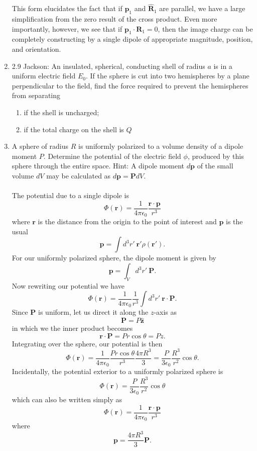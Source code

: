 \documentclass[11pt,letterpaper]{article}
\newcommand{\vect}[1]{\mathbf{#1}}
\newcommand{\vecth}[1]{\hat{\mathbf{#1}}}
\begin{document}
\begin{enumerate}
This form elucidates the fact that if $\vect p_1$ and $\vecth R_1$ are parallel, we have a large simplification from the zero result of the cross product. Even more importantly, however, we see that if $\vect p_1\cdot\vect R_1 =0 $, then the image charge can be completely constructing by a single dipole of appropriate magnitude, position, and orientation. 
  \item 2.9 Jackson: An insulated, spherical, conducting shell of radius $a$ is in a uniform electric field $E_0$. If the sphere is cut into two hemispheres by a plane perpendicular to the field, find the force required to prevent the hemispheres from separating
  \begin{enumerate}
  \item if the shell is uncharged;
  \item if the total charge on the shell is $Q$
  \end{enumerate}
  \item A sphere of radius $R$ is uniformly polarized to a volume density of a dipole moment $P$. Determine the potential of the electric field $\phi$, produced by this sphere through the entire space. Hint: A dipole moment $d\vect p$ of the small volume $dV$ may be calculated as $d\vect p=\vect PdV$. 
  \\ \\The potential due to a single dipole is 
  $$\Phi(\vect r) = \frac{1}{4\pi\epsilon_0}\frac{\vect r\cdot\vect p}{r^3}$$
  where $\vect r$ is the distance from the origin to the point of interest and $\vect p$ is the usual
  $$\vect p = \int{d^3r'\ \vect r'\rho(\vect r')}.$$
  For our uniformly polarized sphere, the dipole moment is given by
  $$\vect p = \int_{V}{d^3r'\ \vect P}.$$
  Now rewriting our potential we have
  $$\Phi(\vect r) = \frac{1}{4\pi\epsilon_0}\frac{1}{r^3}\int{d^3r'\ \vect r\cdot\vect P}.$$
  Since $\vect P$ is uniform, let us direct it along the $z$-axis as
  $$\vect P = P\vecth z$$
  in which we the inner product becomes
  $$\vect r\cdot\vect P = Pr\cos\theta = Pz.$$
  Integrating over the sphere, our potential is then
  $$\Phi(\vect r) = \frac{1}{4\pi\epsilon_0}\frac{Pr\cos\theta}{r^3}\frac{4\pi R^3}{3} = \frac{P}{3\epsilon_0}\frac{R^3}{r^2}\cos\theta.$$
  Incidentally, the potential exterior to a uniformly polarized sphere is 
  $$\Phi(\vect r) = \frac{P}{3\epsilon_0}\frac{R^3}{r^2}\cos\theta$$
  which can also be written simply as
  $$\Phi(\vect r) = \frac{1}{4\pi\epsilon_0}\frac{\vect r\cdot\vect p}{r^3}$$
  where 
  $$\vect p = \frac{4\pi R^3}{3}\vect P.$$
  
\end{enumerate}
\end{document}
